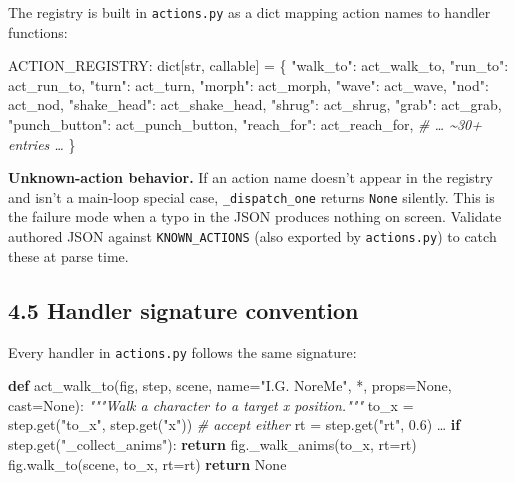 \documentclass[
  11pt,
]{book}
\newenvironment{Shaded}{}{}
\newcommand{\BuiltInTok}[1]{\textcolor[rgb]{0.00,0.50,0.00}{#1}}
\newcommand{\CommentTok}[1]{\textcolor[rgb]{0.38,0.63,0.69}{\textit{#1}}}
\newcommand{\ControlFlowTok}[1]{\textcolor[rgb]{0.00,0.44,0.13}{\textbf{#1}}}
\newcommand{\FloatTok}[1]{\textcolor[rgb]{0.25,0.63,0.44}{#1}}
\newcommand{\KeywordTok}[1]{\textcolor[rgb]{0.00,0.44,0.13}{\textbf{#1}}}
\newcommand{\NormalTok}[1]{#1}
\newcommand{\OperatorTok}[1]{\textcolor[rgb]{0.40,0.40,0.40}{#1}}
\newcommand{\StringTok}[1]{\textcolor[rgb]{0.25,0.44,0.63}{#1}}
\newcommand{\VariableTok}[1]{\textcolor[rgb]{0.10,0.09,0.49}{#1}}
\begin{document}
The registry is built in \texttt{actions.py} as a dict mapping action
names to handler functions:

\begin{Shaded}
\begin{Highlighting}[]
\NormalTok{ACTION\_REGISTRY: }\BuiltInTok{dict}\NormalTok{[}\BuiltInTok{str}\NormalTok{, }\BuiltInTok{callable}\NormalTok{] }\OperatorTok{=}\NormalTok{ \{}
    \StringTok{"walk\_to"}\NormalTok{:   act\_walk\_to,}
    \StringTok{"run\_to"}\NormalTok{:    act\_run\_to,}
    \StringTok{"turn"}\NormalTok{:      act\_turn,}
    \StringTok{"morph"}\NormalTok{:     act\_morph,}
    \StringTok{"wave"}\NormalTok{:      act\_wave,}
    \StringTok{"nod"}\NormalTok{:       act\_nod,}
    \StringTok{"shake\_head"}\NormalTok{: act\_shake\_head,}
    \StringTok{"shrug"}\NormalTok{:     act\_shrug,}
    \StringTok{"grab"}\NormalTok{:      act\_grab,}
    \StringTok{"punch\_button"}\NormalTok{: act\_punch\_button,}
    \StringTok{"reach\_for"}\NormalTok{: act\_reach\_for,}
    \CommentTok{\# … \textasciitilde{}30+ entries …}
\NormalTok{\}}
\end{Highlighting}
\end{Shaded}

\textbf{Unknown-action behavior.} If an action name doesn't appear in
the registry and isn't a main-loop special case,
\texttt{\_dispatch\_one} returns \texttt{None} silently. This is the
failure mode when a typo in the JSON produces nothing on screen.
Validate authored JSON against \texttt{KNOWN\_ACTIONS} (also exported by
\texttt{actions.py}) to catch these at parse time.

\subsection{4.5 Handler signature
convention}\label{handler-signature-convention}

Every handler in \texttt{actions.py} follows the same signature:

\begin{Shaded}
\begin{Highlighting}[]
\KeywordTok{def}\NormalTok{ act\_walk\_to(fig, step, scene, name}\OperatorTok{=}\StringTok{"I.G. NoreMe"}\NormalTok{,}
                \OperatorTok{*}\NormalTok{, props}\OperatorTok{=}\VariableTok{None}\NormalTok{, cast}\OperatorTok{=}\VariableTok{None}\NormalTok{):}
    \CommentTok{"""Walk a character to a target x position."""}
\NormalTok{    to\_x }\OperatorTok{=}\NormalTok{ step.get(}\StringTok{"to\_x"}\NormalTok{, step.get(}\StringTok{"x"}\NormalTok{))  }\CommentTok{\# accept either}
\NormalTok{    rt   }\OperatorTok{=}\NormalTok{ step.get(}\StringTok{"rt"}\NormalTok{, }\FloatTok{0.6}\NormalTok{)}
\NormalTok{    …}
    \ControlFlowTok{if}\NormalTok{ step.get(}\StringTok{"\_collect\_anims"}\NormalTok{):}
        \ControlFlowTok{return}\NormalTok{ fig.\_walk\_anims(to\_x, rt}\OperatorTok{=}\NormalTok{rt)}
\NormalTok{    fig.walk\_to(scene, to\_x, rt}\OperatorTok{=}\NormalTok{rt)}
    \ControlFlowTok{return} \VariableTok{None}
\end{Highlighting}
\end{Shaded}
\end{document}
